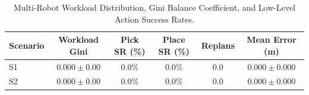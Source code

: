 \begin{table}[t]
\centering
\caption{Multi-Robot Workload Distribution, Gini Balance Coefficient, and Low-Level Action Success Rates.}
\label{tab:robot_coordination}
\begin{tabular}{lccccc}
\toprule
\textbf{Scenario} & \textbf{Workload Gini} & \textbf{Pick SR (\%)} & \textbf{Place SR (\%)} & \textbf{Replans} & \textbf{Mean Error (m)} \\
\midrule
S1 & $0.000 \pm 0.00$ & $0.0\%$ & $0.0\%$ & $0.0$ & $0.000 \pm 0.000$ \\
S2 & $0.000 \pm 0.00$ & $0.0\%$ & $0.0\%$ & $0.0$ & $0.000 \pm 0.000$ \\
\bottomrule
\end{tabular}
\end{table}